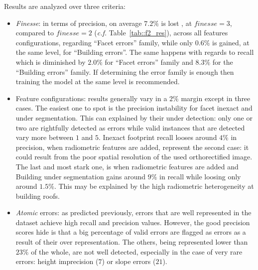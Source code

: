 \documentclass[runningheads]{llncs}
\begin{document}
Results are analyzed over three criteria:
\begin{itemize}
	\item \textit{Finesse}: in terms of precision, on average $7.2\%$ is lost , at $\textit{finesse} = 3$, compared to $\textit{finesse} = 2$ (\textit{c.f.} Table~\ref{tab::f2_res}), across all features configurations, regarding ``Facet errors'' family, while only $0.6\%$ is gained, at the same level, for ``Building errors''. The same happens with regards to recall which is diminished by $2.0\%$ for ``Facet errors'' family and $8.3\%$ for the ``Building errors'' family. If determining the error family is enough then training the model at the same level is recommended.
    \item Feature configurations: results generally vary in a $2\%$ margin except in three cases. The easiest one to spot is the precision instability for facet inexact and under segmentation. This can explained by their under detection: only one or two are rightfully detected as errors while valid instances that are detected vary more between $1$ and $5$. Inexact footprint recall looses around $4\%$ in precision, when radiometric features are added, represent the second case: it could result from the poor spatial resolution of the used orthorectified image. The last and most stark one, is when radiometric features are added and Building under segmentation gains around $9\%$ in recall while loosing only around $1.5\%$. This may be explained by the high radiometric heterogeneity at building roofs.
    \item \textit{Atomic} errors: as predicted previously, errors that are well represented in the dataset achieve high recall and precision values. However, the good precision scores hide is that a big percentage of valid errors are flagged as errors as a result of their over representation. The others, being represented lower than $23\%$ of the whole, are not well detected, especially in the case of very rare errors: height imprecision ($7$) or slope errors ($21$).
\end{itemize}
\end{document}
